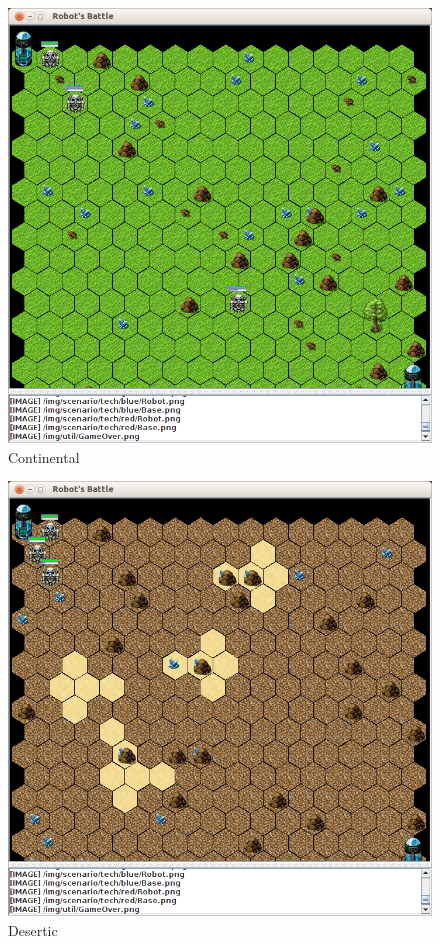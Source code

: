\documentclass[a4paper]{article}
\begin{document}
{{{{{\bigskip

\begin{figure}[h]
   	\centering
    \includegraphics[scale=0.3]{img/continental.png}
    \caption{Continental}
\end{figure}

\newpage %

\begin{figure}[h]
   	\centering
    \includegraphics[scale=0.3]{img/desertic.png}
    \caption{Desertic}
\end{figure}

}}}}}
\end{document}
